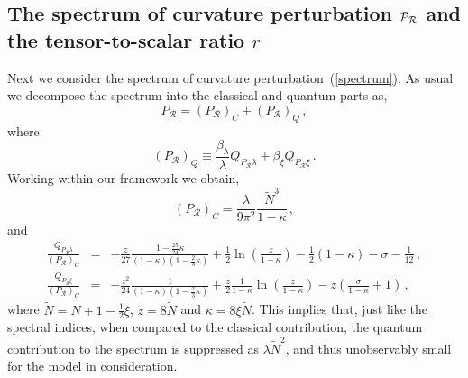 \documentclass[aps,12pt,superscriptaddress,preprintnumbers,
                secnumarabic,nofootinbib,showpacs]{revtex4}
\begin{document}
\subsection{The spectrum of curvature perturbation ${\cal P}_{\cal R}$
          and the tensor-to-scalar ratio $r$}

 Next we consider the spectrum of curvature perturbation~(\ref{spectrum}).
As usual we decompose the spectrum into the classical and quantum parts as,
\begin{equation}
P_\mathcal{R} = \left(P_\mathcal{R}\right)_C +
\left(P_\mathcal{R}\right)_Q
\,,
\label{PR:+}
\end{equation}
where
\begin{equation}
\left(P_\mathcal{R}\right)_Q \equiv
\frac{\beta_\lambda}{\lambda}Q_{P_\mathcal{R}\lambda} + \beta_\xi
Q_{P_\mathcal{R}\xi}
\,.
\end{equation}
Working within our framework we obtain,
\begin{equation}
\left(P_\mathcal{R}\right)_C =
\frac{\lambda}{9\pi^2}\frac{\tilde{N}^3}{1-\kappa}\,,
\label{P_R:C}
\end{equation}
and
\begin{eqnarray}
\frac{Q_{P_\mathcal{R}\lambda}}{\left(P_\mathcal{R}\right)_C} &=&
- \frac{z}{27}\frac{1-\frac{25}{24}\kappa}{(1-\kappa)(1-\frac23\kappa)} +
\frac12\ln\left(\frac{z}{1-\kappa}\right) - \frac12(1-\kappa)
- \sigma - \frac1{12}
\nonumber\,,
\\
\frac{Q_{P_\mathcal{R}\xi}}{\left(P_\mathcal{R}\right)_C} &=&
-\frac{z^2}{24}\frac{1}{(1-\kappa)(1-\frac23\kappa)} +
\frac{z}{2}\frac{1}{1-\kappa}\ln\left(\frac{z}{1-\kappa}\right) -
z\left(\frac{\sigma}{1-\kappa}+1\right)
\,,
\label{PR:Q}
\end{eqnarray}
where $\tilde{N}=N+1-\frac12\xi$, $z=8\tilde N$ and
$\kappa = 8\xi\tilde N$. This implies that, just like the spectral indices,
when compared to the classical contribution, the quantum contribution
to the spectrum is suppressed as $\lambda \tilde N^2$, and thus
unobservably small for the model in consideration.
\end{document}
